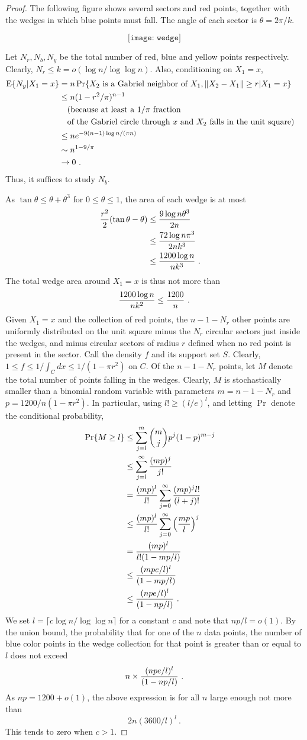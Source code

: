\documentclass[lotsofwhite,charterfonts]{patmorin}
\newcommand{\PROB}{\Pr}
\newcommand{\EXP}{\mathrm{E}}
\begin{document}
\begin{proof}
The following figure shows several sectors and red points, together
with the wedges in which blue points must
fall. The angle of each sector is $\theta = 2\pi / k$.

$$
\texttt{[image: wedge]}
$$

Let $N_r , N_b, N_y$ be the total number of red, blue and yellow
points respectively.
Clearly, $N_r \le k = o(\log n /\log \log n)$.
Also, conditioning on $X_1 = x$,
$$
\begin{aligned}
\EXP \{ N_y | X_1 = x \}
&= n \PROB \{ X_2 ~\hbox{\rm is a Gabriel neighbor of}~ X_1 , \| X_2 - X_1 \| \ge r | X_1 = x \} \cr
&\le n (1-r^2/\pi)^{n-1} \cr
&\quad \hbox{\rm (because at least a $1/\pi$ fraction} \cr
&\quad \hbox{\rm of the Gabriel circle through $x$ and $X_2$ falls in the unit square)} \cr
&\le n e^{-9(n-1) \log n / (\pi n)} \cr
&\sim n^{1-9/\pi} \cr
&\to 0~. \cr
\end{aligned}
$$
Thus, it suffices to study $N_b$.

As $\tan \theta \le \theta + \theta^3$ for $0 \le \theta \le 1$,
the area of each wedge is at most
$$
\begin{aligned}
{ r^2 \over 2} (\tan \theta - \theta)
&\le { 9 \log n \theta^3 \over 2n}  \cr
&\le { 72 \log n \pi^3 \over 2nk^3}  \cr
&\le { 1200 \log n \over n k^3} ~. \cr
\end{aligned}
$$
The total wedge area around $X_1 = x$ is thus not more
than
$$
{ 1200 \log n \over n k^2 } \le { 1200 \over n }~.
$$
Given $X_1 = x$ and the collection of red points,
the $n-1-N_r$ other points are uniformly distributed
on the unit square minus the $N_r$ circular
sectors just inside the wedges, and minus 
circular sectors of radius $r$ defined when no
red point is present in the sector. Call the density $f$
and its support set $S$. Clearly, 
$1 \le f \le 1/\int_C dx \le 1/(1-\pi r^2)$ on $C$.
Of the $n-1-N_r$ points, let $M$ denote the total
number of points falling in the wedges.
Clearly, $M$ is stochastically smaller
than a binomial random variable with parameters
$m = n-1-N_r$ and $p = 1200/n(1-\pi r^2)$.
In particular, using $l! \ge (l/e)^l$,
and letting $\PROB$ denote the conditional probability,
$$
\begin{aligned}
\PROB \{ M \ge l \}
&\le \sum_{j=l}^m {m \choose j} p^j (1-p)^{m-j} \cr
&\le \sum_{j=l}^\infty {(mp)^j \over j!}  \cr
&=   {(mp)^l \over l!} \sum_{j=0}^\infty {(mp)^j l! \over (l+j)!}  \cr
&\le {(mp)^l \over l!} \sum_{j=0}^\infty \left( {mp \over l} \right)^j  \cr
&=   {(mp)^l \over l! (1-mp/l)}  \cr
&\le   {(mpe/l)^l \over (1-mp/l)}  \cr
&\le   {(npe/l)^l \over (1-np/l)} ~. \cr
\end{aligned}
$$
We set $l = \lceil c \log n / \log \log n \rceil$ for a constant $c$
and note that $np/l = o(1)$.
By the union bound, 
the probability that for one of the $n$ data points,
the number of blue color points in the wedge collection
for that point is greater than or equal to $l$ does not
exceed 
$$
n \times {(npe/l)^l \over (1-np/l)} ~. 
$$
As $np = 1200+o(1)$, the above expression is for all $n$
large enough not more than
$$
2n (3600/l)^l~.
$$
This tends to zero when $c > 1$.


\end{proof}
\end{document}
